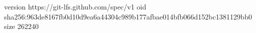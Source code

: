 version https://git-lfs.github.com/spec/v1
oid sha256:963de8167fb0d10d9ea6a44304c989b177afbae014bfb066d152bc1381129bb0
size 262240
